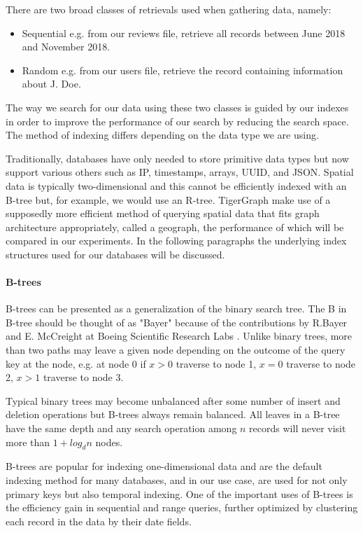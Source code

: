 There are two broad classes\cite{btree} of retrievals used when gathering data, namely:
\begin{itemize}
    \item Sequential e.g. from our reviews file, retrieve all records between June 2018 and November 2018.
    \item Random e.g. from our users file, retrieve the record containing information about J. Doe.
\end{itemize}
The way we search for our data using these two classes is guided by our indexes in order to improve the performance of our search by reducing the search space. The method of indexing differs depending on the data type we are using. 

Traditionally, databases have only needed to store primitive data types but now support various others such as IP, timestamps, arrays, UUID, and JSON. Spatial data is typically two-dimensional and this cannot be efficiently indexed with an B-tree but, for example, we would use an R-tree. TigerGraph make use of a supposedly more efficient method of querying spatial data that fits graph architecture appropriately, called a geograph, the performance of which will be compared in our experiments. In the following paragraphs the underlying index structures used for our databases will be discussed.

\paragraph{B-trees}
B-trees can be presented as a generalization of the binary search tree. The B in B-tree should be thought of as "Bayer" because of the contributions by R.Bayer and E. McCreight at Boeing Scientific Research Labs \cite{btree}. Unlike binary trees, more than two paths may leave a given node depending on the outcome of the query key at the node, e.g. at node 0 if $x>0$ traverse to node 1, $x=0$ traverse to node 2, $x>1$ traverse to node 3.

Typical binary trees may become unbalanced after some number of insert and deletion operations but B-trees always remain balanced. All leaves in a B-tree have the same depth and any search operation among $n$ records will never visit more than $1 + log_dn$ nodes.

B-trees are popular for indexing one-dimensional data and are the default indexing method for many databases, and in our use case, are used for not only primary keys but also temporal indexing. One of the important uses of B-trees is the efficiency gain in sequential and range queries, further optimized by clustering each record in the data by their date fields. 

